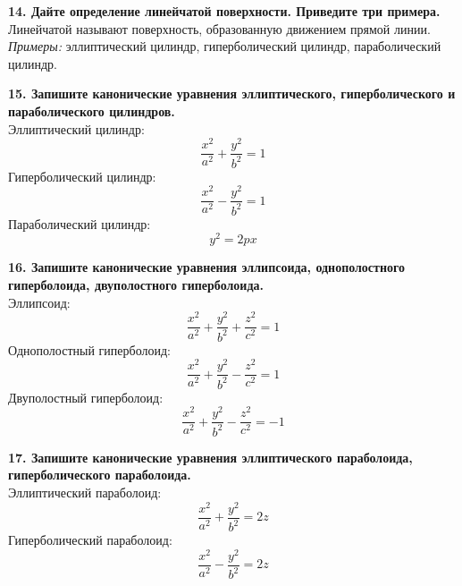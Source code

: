 \documentclass[11pt,a4paper]{article}
\begin{document}
\textbf{14. Дайте определение линейчатой поверхности. Приведите три примера.\\}
Линейчатой называют поверхность, образованную движением прямой линии.\\
\textit{Примеры:} эллиптический цилиндр, гиперболический цилиндр, параболический цилиндр.

\textbf{15. Запишите канонические уравнения эллиптического, гиперболического и параболического цилиндров.\\}
Эллиптический цилиндр: $$\frac{x^2}{a^2} + \frac{y^2}{b^2} = 1$$
Гиперболический цилиндр: $$\frac{x^2}{a^2} - \frac{y^2}{b^2} = 1$$
Параболический цилиндр: $$y^2 = 2px$$

\textbf{16. Запишите канонические уравнения эллипсоида, однополостного гиперболоида, двуполостного гиперболоида.\\}
Эллипсоид: $$\frac{x^2}{a^2} + \frac{y^2}{b^2} + \frac{z^2}{c^2} = 1$$
Однополостный гиперболоид: $$\frac{x^2}{a^2} + \frac{y^2}{b^2} - \frac{z^2}{c^2} = 1$$
Двуполостный гиперболоид: $$\frac{x^2}{a^2} + \frac{y^2}{b^2} - \frac{z^2}{c^2} = -1$$

\textbf{17. Запишите канонические уравнения эллиптического параболоида, гиперболического параболоида.\\}
Эллиптический параболоид: $$\frac{x^2}{a^2} + \frac{y^2}{b^2} = 2z$$
Гиперболический параболоид: $$\frac{x^2}{a^2} - \frac{y^2}{b^2} = 2z$$
\end{document}
